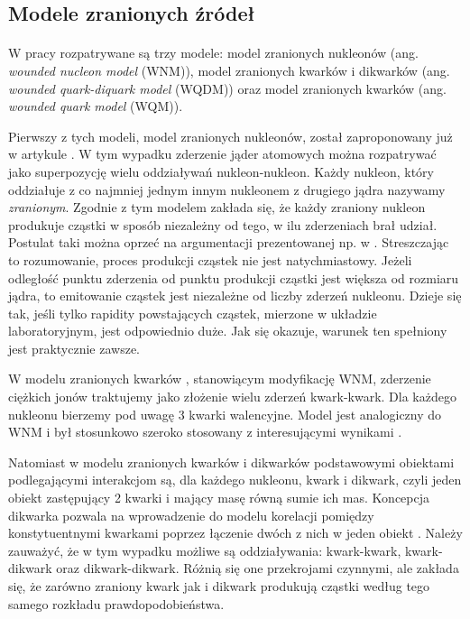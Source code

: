 \documentclass[a4paper,12pt]{article}
\begin{document}
\subsection{Modele zranionych źródeł}
\paragraph{}
W pracy rozpatrywane są trzy modele: model zranionych nukleonów (ang. \textit{wounded nucleon model} (WNM)), model zranionych kwarków i dikwarków (ang. \textit{wounded quark-diquark model} (WQDM)) oraz model zranionych kwarków (ang. \textit{wounded quark model} (WQM)). 

Pierwszy z tych modeli, model zranionych nukleonów, został zaproponowany już w artykule \cite{Bialas:1976ed}. W tym wypadku zderzenie jąder atomowych można rozpatrywać jako superpozycję wielu oddziaływań nukleon-nukleon. Każdy nukleon, który oddziałuje z co najmniej jednym innym nukleonem z drugiego jądra nazywamy \textit{zranionym}. Zgodnie z tym modelem zakłada się, że każdy zraniony nukleon produkuje cząstki w sposób niezależny od tego, w ilu zderzeniach brał udział. Postulat taki można oprzeć na argumentacji prezentowanej np. w \cite{Bialas:2007eg}. Streszczając to rozumowanie, proces produkcji cząstek nie jest natychmiastowy. Jeżeli odległość punktu zderzenia od punktu produkcji cząstki jest większa od rozmiaru jądra, to emitowanie cząstek jest niezależne od liczby zderzeń nukleonu. Dzieje się tak, jeśli tylko rapidity powstających cząstek, mierzone w układzie laboratoryjnym, jest odpowiednio duże. Jak się okazuje, warunek ten spełniony jest praktycznie zawsze.

W modelu zranionych kwarków \cite{Bialas:1977en}, stanowiącym modyfikację WNM, zderzenie ciężkich jonów traktujemy jako złożenie wielu zderzeń kwark-kwark. Dla każdego nukleonu bierzemy pod uwagę 3 kwarki walencyjne. Model jest analogiczny do WNM i był stosunkowo szeroko stosowany z interesującymi wynikami \cite{Adler:2013aqf,Adare:2015bua,Bozek:2016kpf,Lacey:2016hqy,Loizides:2016djv,Mitchell:2016jio,Bozek:2017elk,Chaturvedi:2016ctn,Zheng:2016nxx,Rohrmoser:2018shp}.

Natomiast w modelu zranionych kwarków i dikwarków \cite{Bialas:2007eg} podstawowymi obiektami podlegającymi interakcjom są, dla każdego nukleonu, kwark i dikwark, czyli jeden obiekt zastępujący 2 kwarki i mający masę równą sumie ich mas. Koncepcja dikwarka pozwala na wprowadzenie do modelu korelacji pomiędzy konstytuentnymi kwarkami poprzez łączenie dwóch z nich w jeden obiekt \cite{Bialas:2006qf}. Należy zauważyć, że w tym wypadku możliwe są oddziaływania: kwark-kwark, kwark-dikwark oraz dikwark-dikwark. Różnią się one przekrojami czynnymi, ale zakłada się, że zarówno zraniony kwark jak i dikwark produkują cząstki według tego samego rozkładu prawdopodobieństwa.
\end{document}
